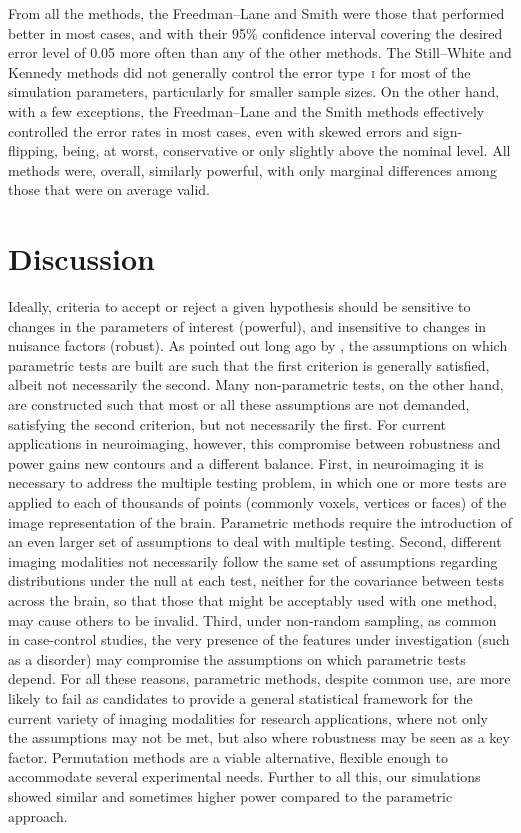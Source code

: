From all the methods, the Freedman--Lane and Smith were those that performed better in most cases, and with their 95\% confidence interval covering the desired error level of 0.05 more often than any of the other methods. The Still--White and Kennedy methods did not generally control the error type~\textsc{i} for most of the simulation parameters, particularly for smaller sample sizes. On the other hand, with a few exceptions, the Freedman--Lane and the Smith methods effectively controlled the error rates in most cases, even with skewed errors and sign-flipping, being, at worst, conservative or only slightly above the nominal level. All methods were, overall, similarly powerful, with only marginal differences among those that were on average valid.

\section{Discussion}

Ideally, criteria to accept or reject a given hypothesis should be sensitive to changes in the parameters of interest (powerful), and insensitive to changes in nuisance factors (robust). As pointed out long ago by \citet{Box1955}, the assumptions on which parametric tests are built are such that the first criterion is generally satisfied, albeit not necessarily the second. Many non-parametric tests, on the other hand, are constructed such that most or all these assumptions are not demanded, satisfying the second criterion, but not necessarily the first. For current applications in neuroimaging, however, this compromise between robustness and power gains new contours and a different balance. First, in neuroimaging it is necessary to address the multiple testing problem, in which one or more tests are applied to each of thousands of points (commonly voxels, vertices or faces) of the image representation of the brain. Parametric methods require the introduction of an even larger set of assumptions to deal with multiple testing. Second, different imaging modalities not necessarily follow the same set of assumptions regarding distributions under the null at each test, neither for the covariance between tests across the brain, so that those that might be acceptably used with one method, may cause others to be invalid. Third, under non-random sampling, as common in case-control studies, the very presence of the features under investigation (such as a disorder) may compromise the assumptions on which parametric tests depend. For all these reasons, parametric methods, despite common use, are more likely to fail as candidates to provide a general statistical framework for the current variety of imaging modalities for research applications, where not only the assumptions may not be met, but also where robustness may be seen as a key factor. Permutation methods are a viable alternative, flexible enough to accommodate several experimental needs. Further to all this, our simulations showed similar and sometimes higher power compared to the parametric approach.

